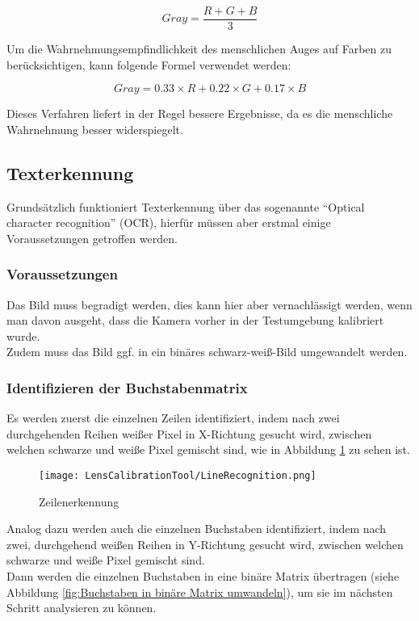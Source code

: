 \begin{equation}
    Gray = \frac{ R + G + B }{ 3}
\end{equation}

{Um die Wahrnehmungsempfindlichkeit des menschlichen Auges auf Farben zu berücksichtigen, kann folgende Formel verwendet werden:
}

\begin{equation}
    Gray = 0.33 \times R + 0.22\times G+ 0.17\times B
\end{equation}

Dieses Verfahren liefert in der Regel bessere Ergebnisse, da es die menschliche Wahrnehmung besser widerspiegelt. \cite{Hasche:2016}

\newpage
\subsection{Texterkennung}
{Grundsätzlich funktioniert Texterkennung über das sogenannte ``Optical character recognition'' (OCR), hierfür müssen aber erstmal einige Voraussetzungen getroffen werden.}

\subsubsection{Voraussetzungen}
{Das Bild muss begradigt werden, dies kann hier aber vernachlässigt werden, wenn man davon ausgeht, dass die Kamera vorher in der Testumgebung kalibriert wurde.
    \\
    Zudem muss das Bild ggf. in ein binäres schwarz-weiß-Bild umgewandelt werden.
}

\subsubsection{Identifizieren der Buchstabenmatrix}
{Es werden zuerst die einzelnen Zeilen identifiziert, indem nach zwei durchgehenden Reihen weißer Pixel in X-Richtung gesucht wird, zwischen welchen schwarze und weiße Pixel gemischt sind, wie in Abbildung \ref{fig:Zeilenerkennung} zu sehen ist.
}

\begin{figure}
    \centering
    \texttt{[image: LensCalibrationTool/LineRecognition.png]}
    \caption{Zeilenerkennung}
    \label{fig:Zeilenerkennung}
\end{figure}

{Analog dazu werden auch die einzelnen Buchstaben identifiziert, indem nach zwei, durchgehend weißen Reihen in Y-Richtung gesucht wird, zwischen welchen schwarze und weiße Pixel gemischt sind.
}
\\
{Dann werden die einzelnen Buchstaben in eine binäre Matrix übertragen (siehe Abbildung \ref{fig:Buchstaben in binäre Matrix umwandeln}), um sie im nächsten Schritt analysieren zu können.
}


